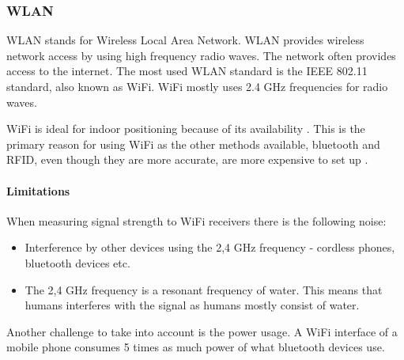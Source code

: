\subsubsection{WLAN}\label{wifi}
WLAN stands for Wireless Local Area Network.
WLAN provides wireless network access by using high frequency radio waves.
The network often provides access to the internet.
The most used WLAN standard is the IEEE 802.11 standard\cite{ieee_wifi_standard}, also known as WiFi.
WiFi mostly uses 2.4 GHz frequencies for radio waves\cite{ieee_wifi_standard}.


WiFi is ideal for indoor positioning because of its availability
\cite{indoor_maps_google_slides}\cite{improving_wifi_using_bluetooth}.
This	 is the primary reason for using WiFi as the other methods available, bluetooth and RFID, even though they are more accurate, are more expensive to set up \cite{improving_wifi_using_bluetooth}.

\paragraph{Limitations}
When measuring signal strength to WiFi receivers there is the following noise:
 \begin{itemize}
 	\item Interference by other devices using the 2,4 GHz frequency - cordless phones, bluetooth devices etc.
 	\item The 2,4 GHz frequency is a resonant frequency of water. This means that humans interferes with the signal as humans mostly consist of water.
\end{itemize}

Another challenge to take into account is the power usage.
A WiFi interface of a mobile phone consumes 5 times as much power of what bluetooth devices use\cite{bluetooth_basics}.